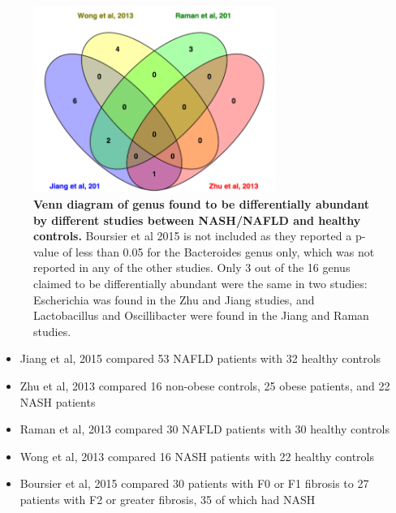 \begin{figure}[h]
\begin{center}
\includegraphics[width=0.7\textwidth]{nafld_papers.png}
\caption{\textbf{Venn diagram of genus found to be differentially abundant by different studies between NASH/NAFLD and healthy controls.} Boursier et al 2015 is not included as they reported a p-value of less than 0.05 for the Bacteroides genus only, which was not reported in any of the other studies. Only 3 out of the 16 genus claimed to be differentially abundant were the same in two studies: Escherichia was found in the Zhu \cite{zhu2013characterization} and Jiang \cite{jiang2015dysbiosis} studies, and Lactobacillus and Oscillibacter were found in the Jiang \cite{jiang2015dysbiosis} and Raman \cite{raman2013fecal} studies.}
\end{center}
\label{nafld_fig1}
\end{figure}

\begin{itemize}
\item Jiang et al, 2015 \cite{jiang2015dysbiosis} compared 53 NAFLD patients with 32 healthy controls

\item Zhu et al, 2013 \cite{zhu2013characterization} compared 16 non-obese controls, 25 obese patients, and 22 NASH patients

\item Raman et al, 2013 \cite{raman2013fecal} compared 30 NAFLD patients with 30 healthy controls

\item Wong et al, 2013 \cite{wong2013molecular} compared 16 NASH patients with 22 healthy controls

\item Boursier et al, 2015 \cite{boursier2016severity} compared 30 patients with F0 or F1 fibrosis to 27 patients with F2 or greater fibrosis, 35 of which had NASH
\end{itemize}

